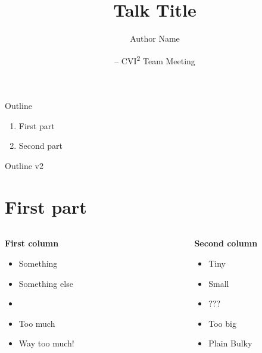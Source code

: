 \documentclass[aspectratio=169]{beamer}
\title{Talk Title}
\author{Author Name}
\date{\displaydate{date} -- CVI\textsuperscript{2} Team Meeting}
\newcommand\redalert[1]{\textcolor{snt red}{#1}}
\begin{document}

\begin{frame}{Outline}
\begin{enumerate}
  \item First part
  \item Second part
\end{enumerate}
\end{frame}

\begin{frame}{Outline v2}
    \tableofcontents
\end{frame}

\section{First part}

\begin{frame}
\begin{columns}
  \begin{column}{.4\linewidth}
  \textbf{First column}
  \begin{itemize}
    \item Something
    \item Something else
    \item {}
    \item Too much
    \item Way too much!
  \end{itemize}
\end{column}
\begin{column}{.2\linewidth}
  \centering
\end{column}
\begin{column}{.4\linewidth}
  \textbf{Second column}
  \begin{itemize}
    \item Tiny
    \item Small
    \item \alert<2>{???}
    \item \redalert{Too big}
    \item Plain Bulky
  \end{itemize}
\end{column}
\end{columns}
\end{frame}
\end{document}
